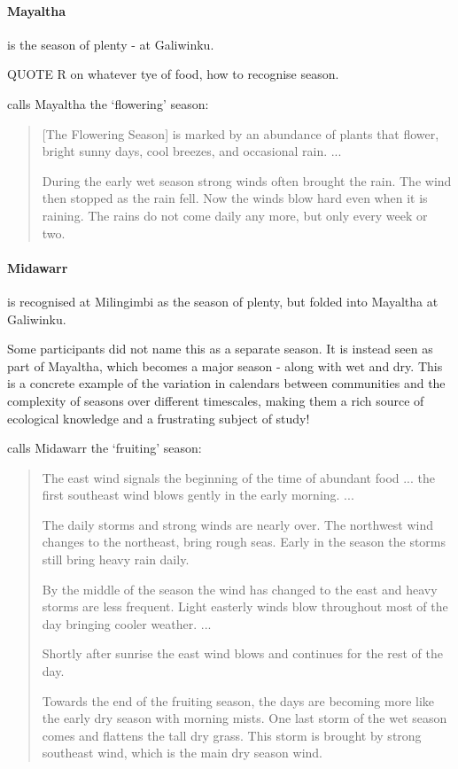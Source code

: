 \paragraph{Mayaltha} is the season of plenty - at Galiwinku.  

QUOTE R on whatever tye of food, how to recognise season.

\citet{davis1989} calls Mayaltha the `flowering' season:
\blockquote{
    [The Flowering Season] is marked by an abundance of plants that flower, bright sunny days, cool breezes, and occasional rain. ...
    
    During the early wet season strong winds often brought the rain.
    The wind then stopped as the rain fell.
    Now the winds blow hard even when it is raining.
    The rains do not come daily any more, but only every week or two.
}


\paragraph{Midawarr} is recognised at Milingimbi as the season of plenty, but folded into Mayaltha at Galiwinku.

Some participants did not name this as a separate season.
It is instead seen as part of Mayaltha, which becomes a major season - along with wet and dry.
This is a concrete example of the variation in calendars between communities and the complexity of seasons over different timescales,
making them a rich source of ecological knowledge and a frustrating subject of study!

\citet{davis1989} calls Midawarr the `fruiting' season:
\blockquote{
    The east wind signals the beginning of the time of abundant food ... the first southeast wind blows gently in the early morning. ...
    
    The daily storms and strong winds are nearly over.  The northwest wind changes to the northeast, bring rough seas.
    Early in the season the storms still bring heavy rain daily.
    
    By the middle of the season the wind has changed to the east and heavy storms are less frequent.
    Light easterly winds blow throughout most of the day bringing cooler weather. ...
    
    Shortly after sunrise the east wind blows and continues for the rest of the day.
    
    Towards the end of the fruiting season, the days are becoming more like the early dry season with morning mists.
    One last storm of the wet season comes and flattens the tall dry grass.
    This storm is brought by strong southeast wind, which is the main dry season wind.
}


